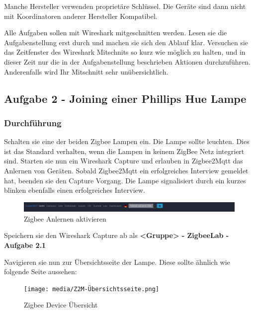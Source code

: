 Manche Hersteller verwenden proprietäre Schlüssel. Die Geräte sind dann nicht mit Koordinatoren anderer Hersteller Kompatibel.

\begin{Hinweis}
    Alle Aufgaben sollen mit Wireshark mitgeschnitten werden. Lesen sie die Aufgabenstellung erst durch und machen sie sich den Ablauf klar. Versuchen sie das 
    Zeitfenster des Wireshark Mitschnits so kurz wie möglich zu halten, und in dieser Zeit nur die in der Aufgabenstellung beschrieben Aktionen durchzuführen.
    Anderenfalls wird Ihr Mitschnitt sehr unübersichtlich.
\end{Hinweis}

\subsection{Aufgabe 2 - Joining einer Phillips Hue Lampe}

\subsubsection{Durchführung}
Schalten sie eine der beiden Zigbee Lampen ein. Die Lampe sollte leuchten. Dies ist das Standard verhalten, wenn die Lampen in keinem ZigBee Netz integriert sind.
Starten sie nun ein Wireshark Capture und erlauben in Zigbee2Mqtt das Anlernen von Geräten. Sobald Zigbee2Mqtt ein erfolgreiches Interview gemeldet hat, beenden sie
den Capture Vorgang. Die Lampe signalisiert durch ein kurzes blinken ebenfalls einen erfolgreiches Interview.

\begin{figure}[H]
    \centering
    \includegraphics[width=1\textwidth]{media/Z2M-Anlernen.png}
    \caption{Zigbee Anlernen aktivieren}
\end{figure}

\begin{Hinweis}
    Speichern sie den Wireshark Capture ab als \textbf{\grqq <Gruppe> - ZigbeeLab - Aufgabe 2.1\grqq{}}
\end{Hinweis}

Navigieren sie nun zur Übersichtsseite der Lampe. Diese sollte ähnlich wie folgende Seite aussehen:

\begin{figure}[H]
    \centering
    \texttt{[image: media/Z2M-Übersichtsseite.png]}
    \caption{Zigbee Device Übersicht}
\end{figure}

